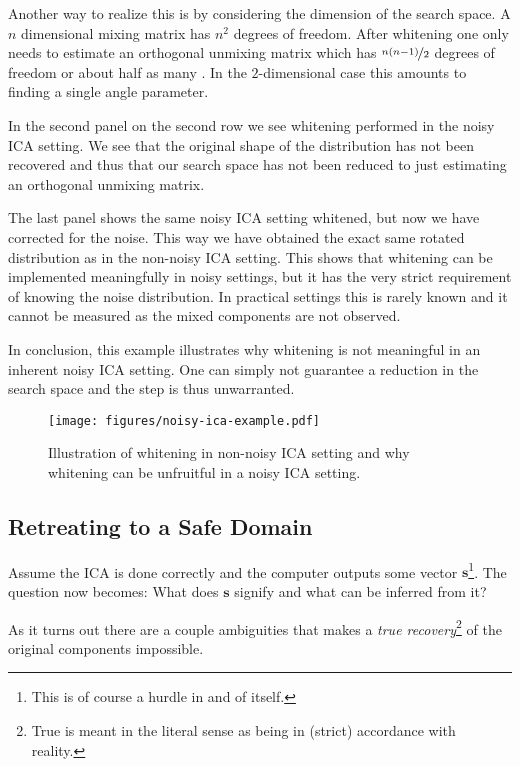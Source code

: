 			Another way to realize this is by considering the dimension of the search space. A $n$ dimensional mixing matrix has $n^2$ degrees of freedom. After whitening one only needs to estimate an orthogonal unmixing matrix which has $\nicefrac{n(n-1)}{2}$ degrees of freedom or about half as many \cite[p.160]{hyvarinen2001}. In the $2$-dimensional case this amounts to finding a single angle parameter.

			In the second panel on the second row we see whitening performed in the noisy ICA setting. We see that the original shape of the distribution has not been recovered and thus that our search space has not been reduced to just estimating an orthogonal unmixing matrix. 

			The last panel shows the same noisy ICA setting whitened, but now we have corrected for the noise. This way we have obtained the exact same rotated distribution as in the non-noisy ICA setting. This shows that whitening can be implemented meaningfully in noisy settings, but it has the very strict requirement of knowing the noise distribution. In practical settings this is rarely known and it cannot be measured as the mixed components are not observed.

			In conclusion, this example illustrates why whitening is not meaningful in an inherent noisy ICA setting. One can simply not guarantee a reduction in the search space and the step is thus unwarranted.

			\begin{figure}
				\centering
					\texttt{[image: figures/noisy-ica-example.pdf]}
				\caption{Illustration of whitening in non-noisy ICA setting and why whitening can be unfruitful in a noisy ICA setting.}
				\label{fig:whitening-noisy-setting}
			\end{figure}


	\subsection{Retreating to a Safe Domain}\label{sec:ambiguities-ica}

	Assume the ICA is done correctly and the computer outputs some vector $\textbf{s}$\footnote{This is of course a hurdle in and of itself.}. The question now becomes: What does $\textbf{s}$ signify and what can be inferred from it? 

	As it turns out there are a couple ambiguities that makes a \textit{true recovery}\footnote{True is meant in the literal sense as being in (strict) accordance with reality.} of the original components impossible. 

